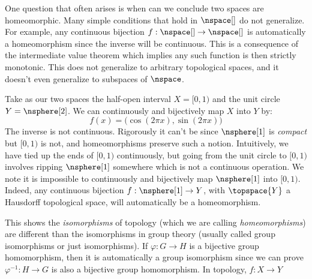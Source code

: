 \documentclass{book}                                                           %
\begin{document}
                One question that often arises is when can we conclude two
                spaces are homeomorphic. Many simple conditions that hold in
                $\nspace[]$ do not generalize. For example, any continuous
                bijection $f:\nspace[]\rightarrow\nspace[]$ is automatically a
                homeomorphism since the inverse will be continuous. This is a
                consequence of the intermediate value theorem which implies any
                such function is then strictly monotonic. This does not
                generalize to arbitrary topological spaces, and it doesn't even
                generalize to subspaces of $\nspace$.
                \begin{example}
                    \label{ex:Cont_Bij_but_not_Homeo}%
                    Take as our two spaces the half-open interval $X=[0,1)$ and
                    the unit circle $Y=\nsphere[2]$. We can continuously and
                    bijectively map $X$ into $Y$ by:
                    \begin{equation}
                        f(x)=\big(\cos(2\pi{x}),\sin(2\pi{x})\big)
                    \end{equation}
                    The inverse is not continuous. Rigorously it can't be
                    since $\nsphere[1]$ is \textit{compact} but $[0,1)$ is not,
                    and homeomorphisms preserve such a notion. Intuitively, we
                    have tied up the ends of $[0,1)$ continuously, but going
                    from the unit circle to $[0,1)$ involves ripping $\nsphere[1]$
                    somewhere which is not a continuous operation. We note it
                    is impossible to continuously and bijectively map $\nsphere[1]$
                    into $[0,1)$. Indeed, any continuous bijection
                    $f:\nsphere[1]\rightarrow{Y}$, with $\topspace{Y}$ a
                    Hausdorff topological space, will automatically be a
                    homeomorphism.
                \end{example}
                This shows the \textit{isomorphisms} of topology (which we are
                calling \textit{homeomorphisms}) are different than the
                isomorphisms in group theory (usually called group isomorphisms
                or just isomorphisms). If $\varphi:G\rightarrow{H}$ is a bijective
                group homomorphism, then it is automatically a group isomorphism
                since we can prove $\varphi^{\minus{1}}:H\rightarrow{G}$ is also
                a bijective group homomorphism. In topology, $f:X\rightarrow{Y}$
\end{document}
